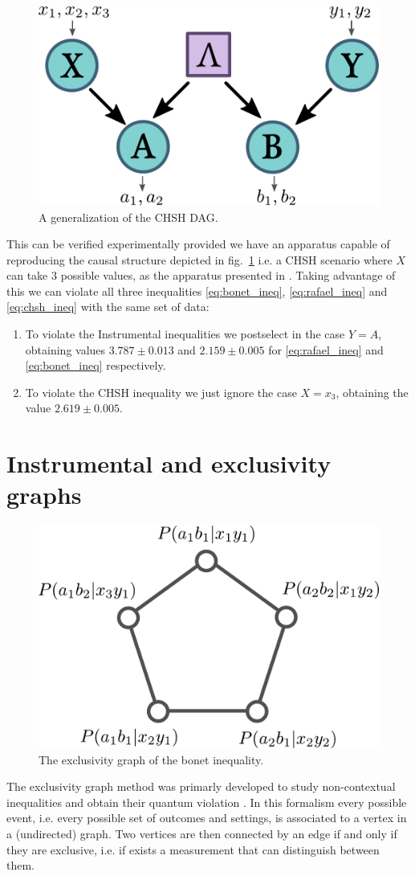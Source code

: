 \documentclass[floatfix, twocolumn, aps, prl]{revtex4-1}
\begin{document}
\begin{figure}[h]
    \centering
    \includegraphics[width=.7\columnwidth]{images/genchshdag.pdf}
    \caption{A generalization of the CHSH DAG.}
    \label{fig:genchshdag}
\end{figure}
This can be verified experimentally provided we have an apparatus capable of
reproducing the causal structure depicted in fig.~\ref{fig:genchshdag} i.e. a CHSH scenario
where $X$ can take 3 possible values, as the apparatus presented in
\cite{chaves2018}.
Taking advantage of this we can violate all three inequalities
\eqref{eq:bonet_ineq}, \eqref{eq:rafael_ineq} and \eqref{eq:chsh_ineq} with the same set of
data:
\begin{enumerate}
    \item To violate the Instrumental inequalities we postselect in the case
        $Y = A$, obtaining values $3.787 \pm 0.013$ and $2.159 \pm 0.005$ for \eqref{eq:rafael_ineq} and
        \eqref{eq:bonet_ineq} respectively.
    \item To violate the CHSH inequality we just ignore the case $X = x_3$,
        obtaining the value $2.619 \pm 0.005$.
\end{enumerate}

\section*{Instrumental and exclusivity graphs}
\begin{figure}[h]
    \centering
    \includegraphics[width=.7\columnwidth]{images/bonetexc.pdf}
    \caption{The exclusivity graph of the bonet inequality.}
    \label{fig:bonetexc}
\end{figure}
The exclusivity graph method was primarly developed to study
non-contextual inequalities and obtain their quantum violation
\cite{cabello2014}. %
In this formalism every possible event, i.e. every possible set of outcomes and
settings, is associated to a vertex in a (undirected) graph.
Two vertices are then connected by an edge if and only if they are exclusive,
i.e. if exists a measurement that can distinguish between them. %
\end{document}
